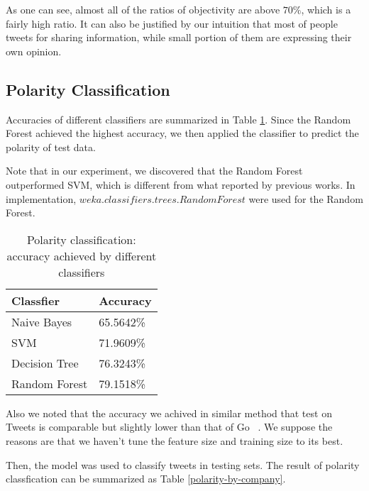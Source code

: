 \documentclass[12pt]{article}
\begin{document}
As one can see, almost all of the ratios of objectivity are above $70\%$, which is a fairly high ratio. It can also be justified by our intuition that most of people tweets for sharing information, while small portion of them are expressing their own opinion.

\subsection{Polarity Classification}
Accuracies of different classifiers are summarized in Table \ref{classifiers-polarity}. Since the Random Forest achieved the highest accuracy, we then applied the classifier to predict the polarity of test data.

Note that in our experiment, we discovered that the Random Forest outperformed SVM, which is different from what reported by previous works. In implementation, $weka.classifiers.trees.RandomForest$ were used for the Random Forest.

\begin{table}
\begin{center}
    \begin{tabular}{ | l || l | }
        \hline
        \textbf{Classfier} &  \textbf{Accuracy} \\ \hline
        \hline
        Naive Bayes &  65.5642\% \\ \hline
        SVM & 71.9609\% \\ \hline
        Decision Tree & 76.3243\% \\ \hline
        Random Forest & 79.1518\% \\ \hline
    \end{tabular}
\caption{Polarity classification: accuracy achieved by different classifiers}
\label{classifiers-polarity}
\end{center}
\end{table}

Also we noted that the accuracy we achived in similar method that test on Tweets is comparable but slightly lower than that of Go \etal~\cite{Go:09}. We suppose the reasons are that we haven't tune the feature size and training size to its best.

Then, the model was used to classify tweets in testing sets. The result of polarity classfication can be summarized as Table \ref{polarity-by-company}.
\end{document}
